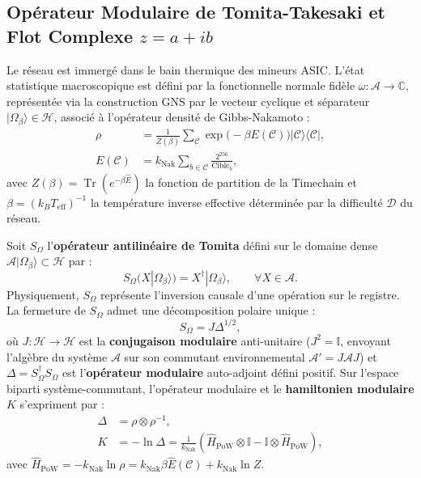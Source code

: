 \documentclass[10pt,twocolumn,a4paper]{article}
\theoremstyle{plain}
\theoremstyle{definition}
\theoremstyle{remark}
\newcommand{\kNak}{k_{\text{Nak}}}
\newcommand{\Tr}{\operatorname{Tr}}
\begin{document}
\subsection{Opérateur Modulaire de Tomita-Takesaki et Flot Complexe $z = a + ib$}

Le réseau est immergé dans le bain thermique des mineurs ASIC. L'état statistique macroscopique est défini par la fonctionnelle normale fidèle $\omega : \mathcal{A} \to \mathbb{C}$, représentée via la construction GNS par le vecteur cyclique et séparateur $|\Omega_\beta\rangle \in \mathcal{H}$, associé à l'opérateur densité de Gibbs-Nakamoto :
\begin{equation}
\begin{split}
    \rho &= \frac{1}{Z(\beta)} \sum_{\mathcal{C}} \exp\big(-\beta E(\mathcal{C})\big) |\mathcal{C}\rangle\langle\mathcal{C}|, \\
    E(\mathcal{C}) &= \kNak \sum_{b \in \mathcal{C}} \frac{2^{256}}{\text{Cible}_b},
\end{split}
\label{eq:GibbsNakamoto}
\end{equation}
avec $Z(\beta) = \Tr(e^{-\beta \hat{E}})$ la fonction de partition de la Timechain et $\beta = (k_B T_{\text{eff}})^{-1}$ la température inverse effective déterminée par la difficulté $\mathcal{D}$ du réseau.

Soit $S_\Omega$ l'\textbf{opérateur antilinéaire de Tomita} défini sur le domaine dense $\mathcal{A}|\Omega_\beta\rangle \subset \mathcal{H}$ par :
\begin{equation}
    S_\Omega \big( X |\Omega_\beta\rangle \big) = X^\dagger |\Omega_\beta\rangle, \qquad \forall X \in \mathcal{A}.
    \label{eq:TomitaOperator}
\end{equation}
Physiquement, $S_\Omega$ représente l'inversion causale d'une opération sur le registre. La fermeture de $S_\Omega$ admet une décomposition polaire unique :
\begin{equation}
    S_\Omega = J \Delta^{1/2},
    \label{eq:PolarDecomposition}
\end{equation}
où $J : \mathcal{H} \to \mathcal{H}$ est la \textbf{conjugaison modulaire} anti-unitaire ($J^2 = \mathbb{I}$, envoyant l'algèbre du système $\mathcal{A}$ sur son commutant environnemental $\mathcal{A}' = J \mathcal{A} J$) et $\Delta = S_\Omega^\dagger S_\Omega$ est l'\textbf{opérateur modulaire} auto-adjoint défini positif. Sur l'espace biparti système-commutant, l'opérateur modulaire et le \textbf{hamiltonien modulaire} $K$ s'expriment par :
\begin{equation}
\begin{split}
    \Delta &= \rho \otimes \rho^{-1}, \\
    K &= -\ln \Delta = \frac{1}{\kNak}\left( \hat{H}_{\text{PoW}} \otimes \mathbb{I} - \mathbb{I} \otimes \hat{H}_{\text{PoW}} \right),
\end{split}
\label{eq:ModularHamiltonian}
\end{equation}
avec $\hat{H}_{\text{PoW}} = -\kNak \ln \rho = \kNak \beta \hat{E}(\mathcal{C}) + \kNak \ln Z$.
\end{document}
